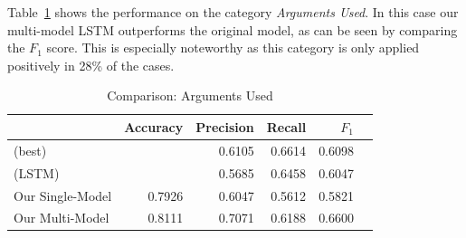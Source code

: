 \documentclass[11pt,a4paper]{article}
\begin{document}
Table~\ref{tab:results:arguments_used} shows the performance on the category \textit{Arguments Used}. In this case our multi-model LSTM outperforms the original model, as can be seen by comparing the $F_1$ score. This is especially noteworthy as this category is only applied positively in 28\% of the cases.  
\begin{table}[h!]
	\centering\tiny
	\begin{tabular}{l r r r r r}
		& Accuracy & Precision & Recall & $F_1$ \\
		\hline
		\cite{Schabus17} (best) & & 0.6105 & 0.6614 & 0.6098 \\
		\cite{Schabus17} (LSTM) & & 0.5685 & 0.6458 & 0.6047\\
		\hline
		Our Single-Model & 0.7926 & 0.6047 & 0.5612 & 0.5821 \\
		Our Multi-Model & 0.8111 & 0.7071 & 0.6188 & 0.6600 \\
	\end{tabular}
	\caption{Comparison: Arguments Used}
	\label{tab:results:arguments_used}
\end{table}
\end{document}
